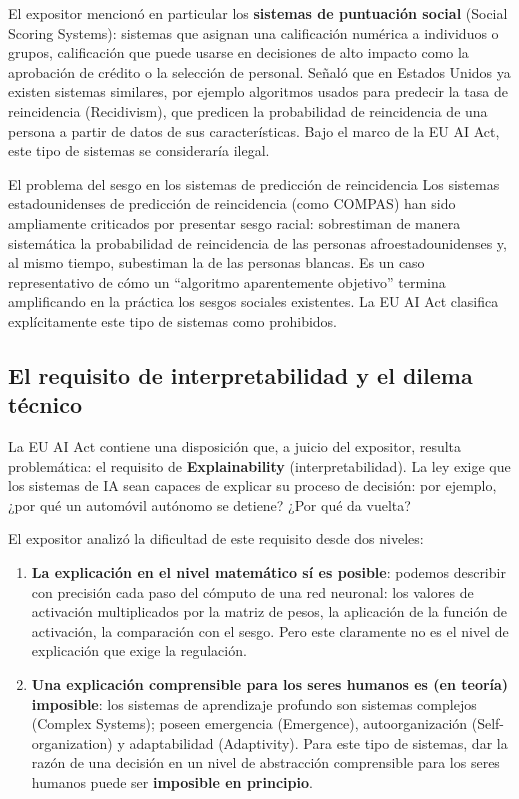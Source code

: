 El expositor mencionó en particular los \textbf{sistemas de puntuación social} (Social Scoring Systems): sistemas que asignan una calificación numérica a individuos o grupos, calificación que puede usarse en decisiones de alto impacto como la aprobación de crédito o la selección de personal. Señaló que en Estados Unidos ya existen sistemas similares, por ejemplo algoritmos usados para predecir la tasa de reincidencia (Recidivism), que predicen la probabilidad de reincidencia de una persona a partir de datos de sus características. Bajo el marco de la EU AI Act, este tipo de sistemas se consideraría ilegal.

\begin{warningbox}{El problema del sesgo en los sistemas de predicción de reincidencia}
Los sistemas estadounidenses de predicción de reincidencia (como COMPAS) han sido ampliamente criticados por presentar sesgo racial: sobrestiman de manera sistemática la probabilidad de reincidencia de las personas afroestadounidenses y, al mismo tiempo, subestiman la de las personas blancas. Es un caso representativo de cómo un ``algoritmo aparentemente objetivo'' termina amplificando en la práctica los sesgos sociales existentes. La EU AI Act clasifica explícitamente este tipo de sistemas como prohibidos.
\end{warningbox}

\subsection{El requisito de interpretabilidad y el dilema técnico}

La EU AI Act contiene una disposición que, a juicio del expositor, resulta problemática: el requisito de \textbf{Explainability} (interpretabilidad). La ley exige que los sistemas de IA sean capaces de explicar su proceso de decisión: por ejemplo, ¿por qué un automóvil autónomo se detiene? ¿Por qué da vuelta?

El expositor analizó la dificultad de este requisito desde dos niveles:

\begin{enumerate}
    \item \textbf{La explicación en el nivel matemático sí es posible}: podemos describir con precisión cada paso del cómputo de una red neuronal: los valores de activación multiplicados por la matriz de pesos, la aplicación de la función de activación, la comparación con el sesgo. Pero este claramente no es el nivel de explicación que exige la regulación.
    \item \textbf{Una explicación comprensible para los seres humanos es (en teoría) imposible}: los sistemas de aprendizaje profundo son sistemas complejos (Complex Systems); poseen emergencia (Emergence), autoorganización (Self-organization) y adaptabilidad (Adaptivity). Para este tipo de sistemas, dar la razón de una decisión en un nivel de abstracción comprensible para los seres humanos puede ser \textbf{imposible en principio}.
\end{enumerate}


